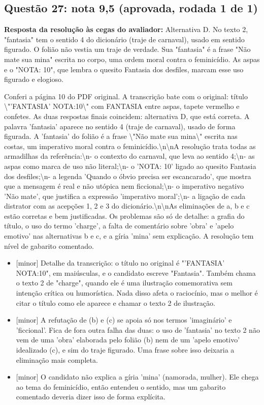\documentclass{article}%
\begin{document}
\subsection*{Questão 27: nota 9,5 (aprovada, rodada 1 de 1)}%
\textbf{Resposta da resolução às cegas do avaliador:} Alternativa D. No texto 2, "fantasia" tem o sentido 4 do dicionário (traje de carnaval), usado em sentido figurado. O folião não vestia um traje de verdade. Sua "fantasia" é a frase "Não mate sua mina" escrita no corpo, uma ordem moral contra o feminicídio. As aspas e o "NOTA: 10", que lembra o quesito Fantasia dos desfiles, marcam esse uso figurado e elogioso.\par %
Conferi a página 10 do PDF original. A transcrição bate com o original: título \textbackslash{}"'FANTASIA' NOTA:10\textbackslash{}" com FANTASIA entre aspas, tapete vermelho e confetes. As duas respostas finais coincidem: alternativa D, que está correta. A palavra 'fantasia' aparece no sentido 4 (traje de carnaval), usado de forma figurada. A 'fantasia' do folião é a frase \textbackslash{}"Não mate sua mina\textbackslash{}" escrita nas costas, um imperativo moral contra o feminicídio.\textbackslash{}n\textbackslash{}nA resolução trata todas as armadilhas da referência:\textbackslash{}n{-} o contexto do carnaval, que leva ao sentido 4;\textbackslash{}n{-} as aspas como marca de uso não literal;\textbackslash{}n{-} o 'NOTA: 10' ligado ao quesito Fantasia dos desfiles;\textbackslash{}n{-} a legenda 'Quando o óbvio precisa ser escancarado', que mostra que a mensagem é real e não utópica nem ficcional;\textbackslash{}n{-} o imperativo negativo 'Não mate', que justifica a expressão 'imperativo moral';\textbackslash{}n{-} a ligação de cada distrator com as acepções 1, 2 e 3 do dicionário.\textbackslash{}n\textbackslash{}nAs eliminações de a, b e c estão corretas e bem justificadas. Os problemas são só de detalhe: a grafia do título, o uso do termo 'charge', a falta de comentário sobre 'obra' e 'apelo emotivo' nas alternativas b e c, e a gíria 'mina' sem explicação. A resolução tem nível de gabarito comentado.%
\begin{itemize}%
\item%
{[}minor{]} Detalhe da transcrição: o título no original é "'FANTASIA' NOTA:10", em maiúsculas, e o candidato escreve "Fantasia". Também chama o texto 2 de "charge", quando ele é uma ilustração comemorativa sem intenção crítica ou humorística. Nada disso afeta o raciocínio, mas o melhor é citar o título como ele aparece e chamar o texto 2 de ilustração.%
\item%
{[}minor{]} A refutação de (b) e (c) se apoia só nos termos 'imaginário' e 'ficcional'. Fica de fora outra falha das duas: o uso de 'fantasia' no texto 2 não vem de uma 'obra' elaborada pelo folião (b) nem de um 'apelo emotivo' idealizado (c), e sim do traje figurado. Uma frase sobre isso deixaria a eliminação mais completa.%
\item%
{[}minor{]} O candidato não explica a gíria 'mina' (namorada, mulher). Ele chega ao tema do feminicídio, então entendeu o sentido, mas um gabarito comentado deveria dizer isso de forma explícita.%
\end{itemize}%
\end{document}
